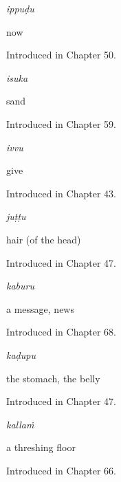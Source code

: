 \noindent\begin{minipage}[t]{\linewidth}
\raggedright
\textbf{}\enspace\emph{ippuḍu}\par
\small now\par
\footnotesize Introduced in Chapter 50.
\end{minipage}\par\medskip

\noindent\begin{minipage}[t]{\linewidth}
\raggedright
\textbf{}\enspace\emph{isuka}\par
\small sand\par
\footnotesize Introduced in Chapter 59.
\end{minipage}\par\medskip

\noindent\begin{minipage}[t]{\linewidth}
\raggedright
\textbf{}\enspace\emph{ivvu}\par
\small give\par
\footnotesize Introduced in Chapter 43.
\end{minipage}\par\medskip

\noindent\begin{minipage}[t]{\linewidth}
\raggedright
\textbf{}\enspace\emph{juṭṭu}\par
\small hair (of the head)\par
\footnotesize Introduced in Chapter 47.
\end{minipage}\par\medskip

\noindent\begin{minipage}[t]{\linewidth}
\raggedright
\textbf{}\enspace\emph{kaburu}\par
\small a message, news\par
\footnotesize Introduced in Chapter 68.
\end{minipage}\par\medskip

\noindent\begin{minipage}[t]{\linewidth}
\raggedright
\textbf{}\enspace\emph{kaḍupu}\par
\small the stomach, the belly\par
\footnotesize Introduced in Chapter 47.
\end{minipage}\par\medskip

\noindent\begin{minipage}[t]{\linewidth}
\raggedright
\textbf{}\enspace\emph{kallaṁ}\par
\small a threshing floor\par
\footnotesize Introduced in Chapter 66.
\end{minipage}\par\medskip

